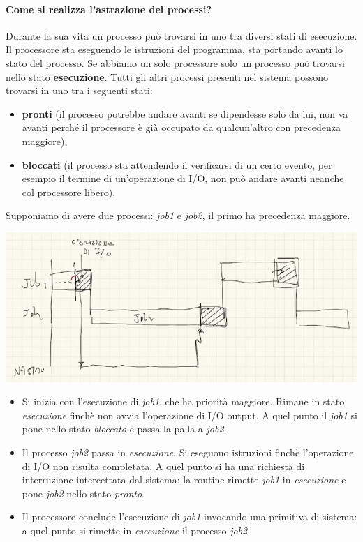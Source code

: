 \documentclass[11pt]{report}
\theoremstyle{definition}
\begin{document}
\paragraph{Come si realizza l'astrazione dei processi?}
Durante la sua vita un processo può trovarsi in uno tra diversi stati di esecuzione. Il processore sta eseguendo le istruzioni del programma, sta portando avanti lo stato del processo.  Se abbiamo un solo processore solo un processo può trovarsi nello stato \textbf{esecuzione}. Tutti gli altri processi presenti nel sistema possono trovarsi in uno tra i seguenti stati:
\begin{itemize}
	\item \textbf{pronti} (il processo potrebbe andare avanti se dipendesse solo da lui, non va avanti perché il processore è già occupato da qualcun'altro con precedenza maggiore),
	\item \textbf{bloccati} (il processo sta attendendo il verificarsi di un certo evento, per esempio il termine di un'operazione di I/O, non può andare avanti neanche col processore libero).
\end{itemize}
Supponiamo di avere due processi: \emph{job1} e \emph{job2}, il primo ha precedenza maggiore.
\begin{center}\includegraphics[scale=.75]{img/127.PNG}\end{center}
\begin{itemize}
	\item Si inizia con l'esecuzione di \emph{job1}, che ha priorità maggiore. Rimane in stato \emph{esecuzione} finchè non avvia l'operazione di I/O output. A quel punto il \emph{job1} si pone nello stato \emph{bloccato} e passa la palla a \emph{job2}.
	\item Il processo \emph{job2} passa in \emph{esecuzione}. Si eseguono istruzioni finchè l'operazione di I/O non risulta completata. A quel punto si ha una richiesta di interruzione intercettata dal sistema: la routine rimette \emph{job1} in \emph{esecuzione} e pone \emph{job2} nello stato \emph{pronto}.
	\item Il processore conclude l'esecuzione di \emph{job1} invocando una primitiva di sistema: a quel punto si rimette in \emph{esecuzione} il processo \emph{job2}.
\end{itemize}
\end{document}
